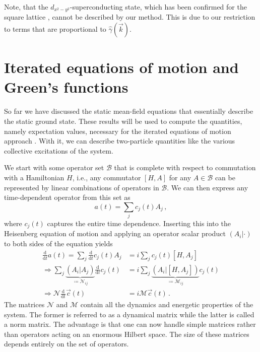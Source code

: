 \documentclass[
    reprint, 
    aps,
    preprintnumbers,
    twocolumn,
    prb,
    superscriptaddress
]{revtex4-2}
\newcommand{\vk}{\vec{k}}
\newcommand{\ddt}{\frac{\mathrm{d}}{\mathrm{d}t}}
\newcommand{\mM}{\mathcal{M}}
\newcommand{\mN}{\mathcal{N}}
\begin{document}
Note, that the $d_{x^2 - y^2}$-superconducting state, which has been confirmed for the square lattice \cite{Micnas88b,Huang13}, cannot be described by our method. 
This is due to our restriction to terms that are proportional to $\hat{\gamma}(\vk)$.


\section{Iterated equations of motion and Green's functions}\label{sec:ieom}

So far we have discussed the static mean-field equations that essentially describe the static ground state.
These results will be used to compute the quantities, namely expectation values, necessary for the iterated equations of motion approach \cite{uhrig09,hamerla13,hamerla14,bleicker18}.
With it, we can describe two-particle quantities like the various collective excitations of the system.

We start with some operator set $\mathcal{B}$ that is complete with respect to commutation with a Hamiltonian $H$, 
i.e., any commutator $[H, A]$ for any $A \in \mathcal{B}$ can be represented by linear combinations of operators in $\mathcal{B}$.
We can then express any time-dependent operator from this set as
\begin{equation}
    a(t) = \sum_j c_j(t) A_j\,,
\end{equation}
where $c_j(t)$ captures the entire time dependence. 
Inserting this into the Heisenberg equation of motion and applying an operator scalar product $(A_i|\cdot)$ to both sides of the equation yields
\begin{equation}
    \label{eqn:heisenberg}
    \begin{aligned}
        \ddt a(t) = \sum_j \ddt c_j(t) A_j &= i \sum_j c_j(t) [H, A_j] \\
        \Rightarrow \sum_j \underbrace{(A_i | A_j)}_{\coloneqq \mN_{ij}} \ddt c_j(t) &= i \sum_j \underbrace{(A_i | [H, A_j])}_{\coloneqq \mM_{ij}} c_j(t) \\
        \Rightarrow \mN \ddt \vec{c}(t) &= i \mM \vec{c}(t)\,.
    \end{aligned}
\end{equation}
The matrices $\mN$ and $\mM$ contain all the dynamics and energetic properties of the system.
The former is referred to as a dynamical matrix while the latter is called a norm matrix.
The advantage is that one can now handle simple matrices rather than operators acting on an enormous Hilbert space.
The size of these matrices depends entirely on the set of operators.
\end{document}
